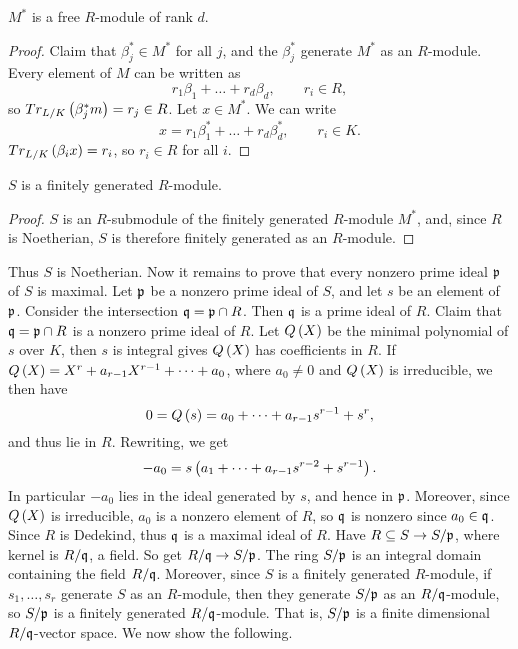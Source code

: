 \pagebreak

\begin{corollary}
$ M^* $ is a free $ R $-module of rank $ d $.
\end{corollary}

\begin{proof}
Claim that $ \beta_j^* \in M^* $ for all $ j $, and the $ \beta_j^* $ generate $ M^* $ as an $ R $-module. Every element of $ M $ can be written as
$$ r_1\beta_1 + \dots + r_d\beta_d, \qquad r_i \in R, $$
so $ Tr_{L / K}\left( \beta_j^*m \right) = r_j \in R $. Let $ x \in M^* $. We can write
$$ x = r_1\beta_1^* + \dots + r_d\beta_d^*, \qquad r_i \in K. $$
$ Tr_{L / K}\left( \beta_ix \right) = r_i $, so $ r_i \in R $ for all $ i $.
\end{proof}

\begin{corollary}
$ S $ is a finitely generated $ R $-module.
\end{corollary}

\begin{proof}
$ S $ is an $ R $-submodule of the finitely generated $ R $-module $ M^* $, and, since $ R $ is Noetherian, $ S $ is therefore finitely generated as an $ R $-module.
\end{proof}

Thus $ S $ is Noetherian. Now it remains to prove that every nonzero prime ideal $ \mathfrak{p} $ of $ S $ is maximal. Let $ \mathfrak{p} $ be a nonzero prime ideal of $ S $, and let $ s $ be an element of $ \mathfrak{p} $. Consider the intersection $ \mathfrak{q} = \mathfrak{p} \cap R $. Then $ \mathfrak{q} $ is a prime ideal of $ R $. Claim that $ \mathfrak{q} = \mathfrak{p} \cap R $ is a nonzero prime ideal of $ R $. Let $ Q\left( X \right) $ be the minimal polynomial of $ s $ over $ K $, then $ s $ is integral gives $ Q\left( X \right) $ has coefficients in $ R $. If $ Q\left( X \right) = X^r + a_{r - 1}X^{r - 1} + \dots + a_0 $, where $ a_0 \ne 0 $ and $ Q\left( X \right) $ is irreducible, we then have
$$ 0 = Q\left( s \right) = a_0 + \dots + a_{r - 1}s^{r - 1} + s^r, $$
and thus lie in $ R $. Rewriting, we get
$$ -a_0 = s\left( a_1 + \dots + a_{r - 1}s^{r - 2} + s^{r - 1} \right). $$
In particular $ -a_0 $ lies in the ideal generated by $ s $, and hence in $ \mathfrak{p} $. Moreover, since $ Q\left( X \right) $ is irreducible, $ a_0 $ is a nonzero element of $ R $, so $ \mathfrak{q} $ is nonzero since $ a_0 \in \mathfrak{q} $. Since $ R $ is Dedekind, thus $ \mathfrak{q} $ is a maximal ideal of $ R $. Have $ R \subseteq S \to S / \mathfrak{p} $, where kernel is $ R / \mathfrak{q} $, a field. So get $ R / \mathfrak{q} \to S / \mathfrak{p} $. The ring $ S / \mathfrak{p} $ is an integral domain containing the field $ R / \mathfrak{q} $. Moreover, since $ S $ is a finitely generated $ R $-module, if $ s_1, \dots, s_r $ generate $ S $ as an $ R $-module, then they generate $ S / \mathfrak{p} $ as an $ R / \mathfrak{q} $-module, so $ S / \mathfrak{p} $ is a finitely generated $ R / \mathfrak{q} $-module. That is, $ S / \mathfrak{p} $ is a finite dimensional $ R / \mathfrak{q} $-vector space. We now show the following.

